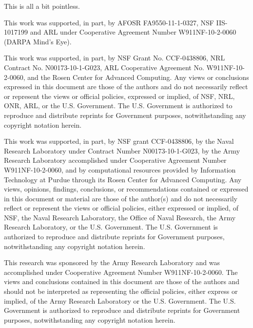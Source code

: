 \begin{dedication}
  This is all a bit pointless.
\end{dedication}

\begin{acknowledgments}
  \needswork
  This work was supported, in part, by AFOSR FA9550-11-1-0327, NSF IIS-1017199
  and ARL under Cooperative Agreement Number W911NF-10-2-0060 (DARPA Mind's Eye).

  This work was supported, in part, by NSF Grant No. CCF-0438806, NRL Contract No.
  N00173-10-1-G023, ARL Cooperative Agreement No. W911NF-10-2-0060, and the Rosen
  Center for Advanced Computing.
  Any views or conclusions expressed in this document are those of the authors
  and do not necessarily reflect or represent the views or official policies,
  expressed or implied, of NSF, NRL, ONR, ARL, or the U.S. Government.
  The U.S. Government is authorized to reproduce and distribute reprints for
  Government purposes, notwithstanding any copyright notation herein.

  This work was supported, in part, by NSF grant CCF-0438806, by the Naval
  Research Laboratory under Contract Number N00173-10-1-G023, by the Army
  Research Laboratory accomplished under Cooperative Agreement Number
  W911NF-10-2-0060, and by computational resources provided by Information
  Technology at Purdue through its Rosen Center for Advanced Computing.
  Any views, opinions, findings, conclusions, or recommendations contained or
  expressed in this document or material are those of the author(s) and do not
  necessarily reflect or represent the views or official policies, either
  expressed or implied, of NSF, the Naval Research Laboratory, the Office of
  Naval Research, the Army Research Laboratory, or the U.S. Government.
  The U.S. Government is authorized to reproduce and distribute reprints for
  Government purposes, notwithstanding any copyright notation herein.\@

  This research was sponsored by the Army Research Laboratory and was
  accomplished under Cooperative Agreement Number W911NF-10-2-0060.
  The views and conclusions contained in this document are those of the authors
  and should not be interpreted as representing the official policies, either
  express or implied, of the Army Research Laboratory or the U.S. Government.
  The U.S. Government is authorized to reproduce and distribute reprints for
  Government purposes, notwithstanding any copyright notation herein.


\end{acknowledgments}
